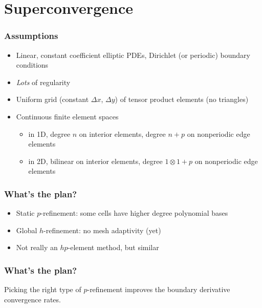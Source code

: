 \documentclass[8pt]{beamer}
\begin{document}
\section{Superconvergence}
\begin{frame}
    \frametitle{Assumptions}
    \begin{itemize}
        \item Linear, constant coefficient elliptic PDEs, Dirichlet (or
              periodic) boundary conditions
              \pause
        \item \emph{Lots} of regularity
              \pause
        \item Uniform grid (constant \(\Delta x\), \(\Delta y\)) of tensor
              product elements (no triangles)
              \pause
        \item Continuous finite element spaces
              \begin{itemize}
                  \item in 1D, degree \(n\) on interior elements, degree \(n +
                        p\) on nonperiodic edge elements
                  \item in 2D, bilinear on interior elements, degree \(1 \otimes
                        1 + p\) on nonperiodic edge elements
              \end{itemize}
    \end{itemize}
\end{frame}

\begin{frame}
    \frametitle{What's the plan?}
    \begin{itemize}
        \item Static \(p\)-refinement: some cells have higher degree polynomial bases
        \item Global \(h\)-refinement: no mesh adaptivity (yet)
        \item Not really an \(hp\)-element method, but similar
    \end{itemize}
\end{frame}

\begin{frame}
    \frametitle{What's the plan?}
    \begin{center}
        Picking the right type of \(p\)-refinement improves the boundary
        derivative convergence rates.
    \end{center}
\end{frame}
\end{document}
